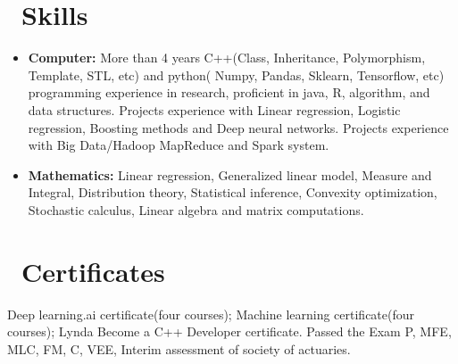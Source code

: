 \documentclass{resume}
\begin{document}
\section{\faWrench
\ Skills}
\begin{itemize}[parsep=0.5ex]\large
  \item \textbf{Computer:} More than 4 years C++(Class,  Inheritance,  Polymorphism,  Template,  STL,  etc) and python( Numpy,  Pandas, 
  Sklearn,  Tensorflow,  etc) programming experience in research, proficient in java, R, algorithm, and data structures. Projects experience with Linear regression, Logistic regression, Boosting methods and Deep neural networks.  Projects experience with Big Data/Hadoop MapReduce and Spark system. 
  
  \item \textbf{Mathematics:}
   Linear regression, Generalized linear model, Measure and Integral,  Distribution theory, Statistical inference, Convexity optimization, Stochastic calculus, Linear algebra and matrix computations. 
  
\end{itemize}

\section{\faShirtsinbulk \ Certificates}\large 
Deep learning.ai certificate(four courses); Machine learning certificate(four courses); Lynda Become a C++ Developer certificate. Passed the Exam P, MFE, MLC, FM, C, VEE, Interim assessment of society of actuaries.

%
%
\end{document}
